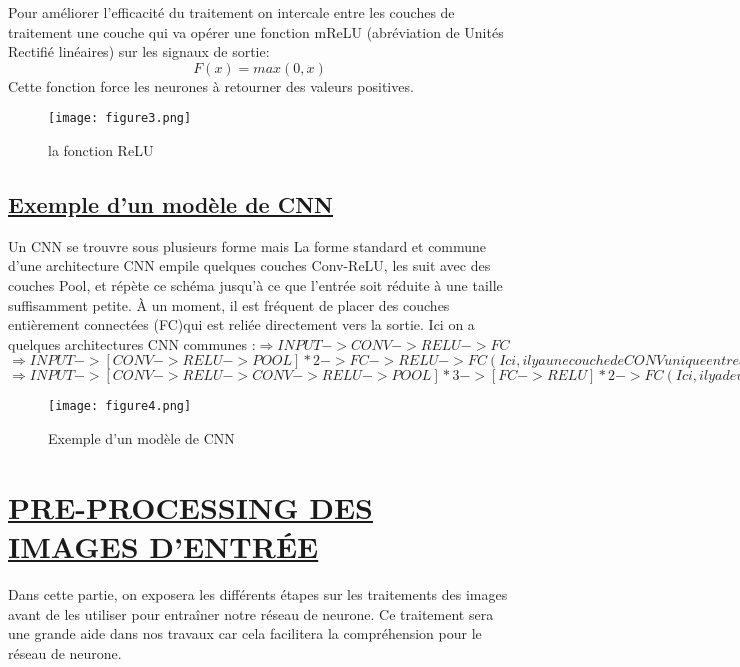 \documentclass[11pt]{article}
\begin{document}
Pour améliorer l'efficacité du traitement on intercale entre les couches de traitement une
couche qui va opérer une fonction mReLU (abréviation de Unités Rectifié linéaires) sur les signaux de sortie: 
\newline $$F(x)=max(0,x)$$ Cette fonction force les neurones à retourner des valeurs positives.
\begin{figure}[h]
\centering
\texttt{[image: figure3.png]}
\caption{la fonction ReLU}
\label{fig:figure3}
\end{figure}
\newpage

\subsection{\underline{Exemple d'un modèle de CNN}}

Un CNN se trouvre sous plusieurs forme mais La forme standard et commune d'une architecture CNN empile quelques couches Conv-ReLU, les suit avec
des couches Pool, et répète ce schéma jusqu'à ce que l'entrée soit réduite à une taille suffisamment petite. À un moment, il est fréquent de placer des couches entièrement connectées (FC)qui est reliée directement vers la sortie. Ici on a quelques architectures CNN communes :\newline$\Rightarrow INPUT -> CONV -> RELU -> FC$\newline
\newline $\Rightarrow INPUT -> [CONV -> RELU -> POOL] * 2 -> FC -> RELU -> FC ( Ici, il y a une couche de CONV unique entre chaque couche POOL )$\newline \newline$\Rightarrow INPUT -> [CONV -> RELU -> CONV -> RELU -> POOL] * 3 -> [FC -> RELU] * 2 -> FC ( Ici, il y a
deux couches CONV empilées avant chaque couche POOL.)$\newline

\begin{figure}[h]
\centering
\texttt{[image: figure4.png]}
\caption{Exemple d'un modèle de CNN}
\label{fig:figure4}
\end{figure}

\section{\underline{PRE-PROCESSING DES IMAGES D’ENTRÉE}}

Dans cette partie, on exposera les différents étapes sur les traitements des images avant de les utiliser pour entraîner notre réseau de neurone. Ce traitement sera une grande aide dans nos travaux car cela facilitera la compréhension pour le réseau de neurone.
\end{document}
